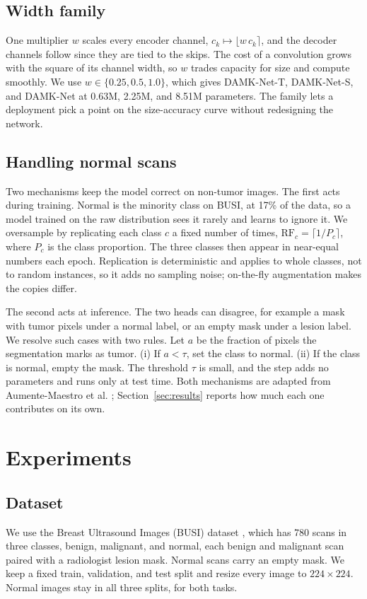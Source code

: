 \documentclass[runningheads]{llncs}
\begin{document}
\subsection{Width family}
One multiplier $w$ scales every encoder channel, $c_k \mapsto \lfloor w\,c_k
\rceil$, and the decoder channels follow since they are tied to the skips. The
cost of a convolution grows with the square of its channel width, so $w$ trades
capacity for size and compute smoothly. We use $w \in \{0.25, 0.5, 1.0\}$, which
gives DAMK-Net-T, DAMK-Net-S, and DAMK-Net at 0.63M, 2.25M, and 8.51M parameters.
The family lets a deployment pick a point on the size-accuracy curve without
redesigning the network.

\subsection{Handling normal scans}
Two mechanisms keep the model correct on non-tumor images. The first acts during
training. Normal is the minority class on BUSI, at 17\% of the data, so a model
trained on the raw distribution sees it rarely and learns to ignore it. We
oversample by replicating each class $c$ a fixed number of times,
$\mathrm{RF}_c = \lceil 1/P_c \rceil$, where $P_c$ is the class proportion. The
three classes then appear in near-equal numbers each epoch. Replication is
deterministic and applies to whole classes, not to random instances, so it adds
no sampling noise; on-the-fly augmentation makes the copies differ.

The second acts at inference. The two heads can disagree, for example a mask with
tumor pixels under a normal label, or an empty mask under a lesion label. We
resolve such cases with two rules. Let $a$ be the fraction of pixels the
segmentation marks as tumor. (i) If $a < \tau$, set the class to normal. (ii) If
the class is normal, empty the mask. The threshold $\tau$ is small, and the step
adds no parameters and runs only at test time. Both mechanisms are adapted from
Aumente-Maestro et al. \cite{CMPB}; Section~\ref{sec:results} reports how much
each one contributes on its own.

\section{Experiments}
\subsection{Dataset}
We use the Breast Ultrasound Images (BUSI) dataset \cite{BUSI}, which has 780
scans in three classes, benign, malignant, and normal, each benign and malignant
scan paired with a radiologist lesion mask. Normal scans carry an empty mask. We
keep a fixed train, validation, and test split and resize every image to
$224\times224$. Normal images stay in all three splits, for both tasks.
\end{document}
